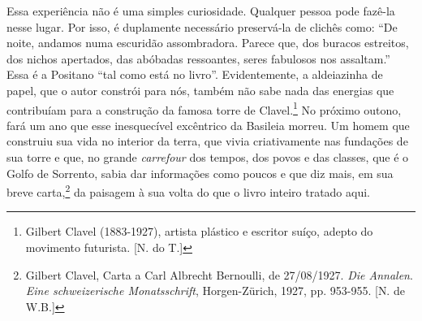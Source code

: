 Essa experiência não é uma simples curiosidade. Qualquer pessoa pode
fazê-la nesse lugar. Por isso, é duplamente necessário preservá-la de
clichês como: ``De noite, andamos numa escuridão assombradora. Parece
que, dos buracos estreitos, dos nichos apertados, das abóbadas
ressoantes, seres fabulosos nos assaltam.'' Essa é a Positano ``tal como
está no livro''. Evidentemente, a aldeiazinha de papel, que o autor
constrói para nós, também não sabe nada das energias que contribuíam
para a construção da famosa torre de Clavel.\footnote{Gilbert Clavel
  (1883-1927), artista plástico e escritor suíço, adepto do movimento
  futurista. {[}N. do T.{]}} No próximo outono, fará um ano que esse
inesquecível excêntrico da Basileia morreu. Um homem que construiu sua
vida no interior da terra, que vivia criativamente nas fundações de sua
torre e que, no grande \emph{carrefour} dos tempos, dos povos e das
classes, que é o Golfo de Sorrento, sabia dar informações como poucos e
que diz mais, em sua breve carta,\footnote{Gilbert Clavel, Carta a Carl
  Albrecht Bernoulli, de 27/08/1927. \emph{Die Annalen}. \emph{Eine
  schweizerische Monatsschrift}, Horgen-Zürich, 1927, pp. 953-955. {[}N.
  de W.B.{]}} da paisagem à sua volta do que o livro inteiro tratado
aqui.

